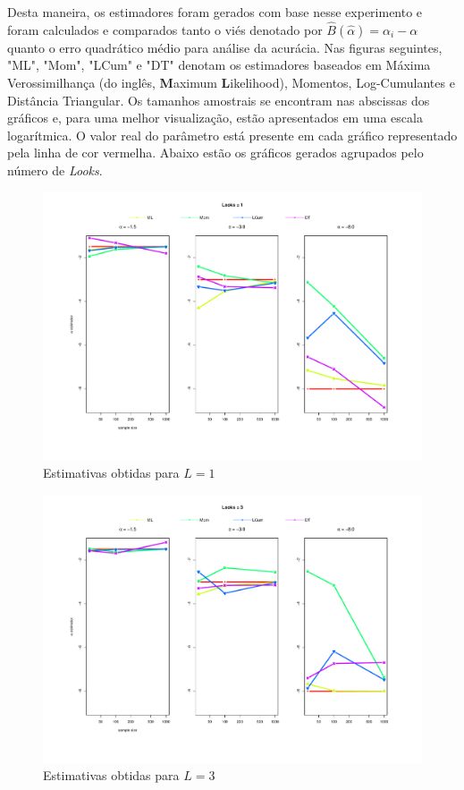 Desta maneira, os estimadores foram gerados com base nesse experimento e foram calculados e comparados tanto o viés denotado por $\widehat{B}(\widehat{\alpha}) = \alpha_i - \alpha$ 
quanto o erro quadrático médio para análise da acurácia. Nas figuras seguintes, "ML", "Mom", "LCum" e "DT" denotam os estimadores baseados em Máxima Verossimilhança (do inglês, \textbf{M}aximum \textbf{L}ikelihood), Momentos, Log-Cumulantes e Distância Triangular. Os tamanhos amostrais se encontram nas abscissas dos gráficos e, para uma melhor visualização, estão apresentados em uma escala logarítmica. O valor real do parâmetro está presente em cada gráfico representado pela linha de cor vermelha. Abaixo estão os gráficos gerados agrupados pelo número de \textit{Looks}.
\begin{figure}[H]
     \centering
     \includegraphics[scale=0.5]{plots/estimators_L=1.pdf}
     \caption{Estimativas obtidas para $L=1$}
     \label{graf_8}
\end{figure}
\begin{figure}[H]
     \centering
     \includegraphics[scale=0.5]{plots/estimators_L=3.pdf}
     \caption{Estimativas obtidas para $L=3$}
     \label{graf_9}
\end{figure}
